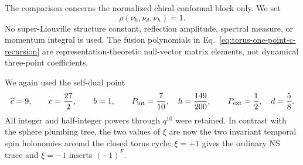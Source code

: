 \documentclass[11pt]{article}
\begin{document}
The comparison concerns the normalized chiral conformal block only.  We set
\begin{equation}
 \rho(\nu_h,\nu_d,\nu_h)=1.
 \label{eq:torus-primary-three-form-normalization}
\end{equation}
No super-Liouville structure constant, reflection amplitude, spectral
measure, or momentum integral is used.  The fusion polynomials in
Eq.~\eqref{eq:torus-one-point-c-recursion} are representation-theoretic
null-vector matrix elements, not dynamical three-point coefficients.

We again used the self-dual point
\begin{equation}
 \widehat c=9,\qquad c=\frac{27}{2},\qquad b=1,
 \qquad
 P_{\rm int}=\frac7{10},\quad h=\frac{149}{200},
 \qquad
 P_{\rm ext}=\frac12,\quad d=\frac58.
 \label{eq:torus-order-ten-benchmark}
\end{equation}
All integer and half-integer powers through \(q^{10}\) were retained.  In
contrast with the sphere plumbing tree, the two values of \(\xi\) are now
the two invariant temporal spin holonomies around the closed torus cycle:
\(\xi=+1\) gives the ordinary NS trace and \(\xi=-1\) inserts
\((-1)^F\).
\end{document}
